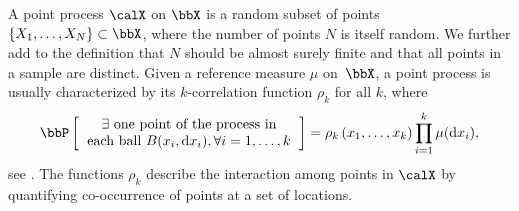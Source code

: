 \documentclass[twoside,11pt]{article}
\begin{document}
    A point process $\calX$ on $\bbX$ is a random subset of points $\lrcb{X_1, \dots, X_N} \subset \bbX$, where the number of points $N$ is itself random.
    We further add to the definition that $N$ should be almost surely finite and that all points in a sample are distinct.
    Given a reference measure $\mu$ on~$\bbX$, a point process is usually characterized by its $k$-correlation function $\rho_k$ for all $k$, where
    \begin{equation*}
    	\Proba{
    		\begin{tabular}{c}
    			$\exists$ one point of the process in\\
    			each ball $B(x_i, \diff x_i), \forall i=1,\dots, k $
    		\end{tabular}
    	}
    	= \rho_k\lrp{x_1,\dots,x_k}
    		\prod_{i=1}^k \mu(\diff x_i),
    \end{equation*}
    see \citet[Section 4]{MoWa04}.
    The functions $\rho_k$ describe the interaction among points in $\calX$ by quantifying co-occurrence of points at a set of locations.

\end{document}
